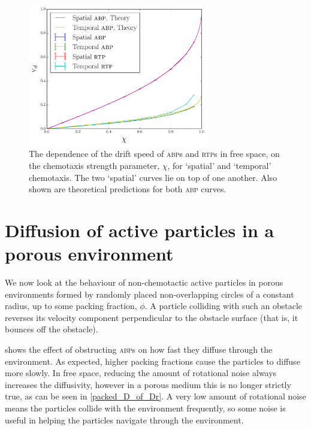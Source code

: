 \documentclass[a4wide,11pt]{article}
\begin{document}
\begin{figure}
    \centering
    \includegraphics[width=0.7\textwidth]{img/free_space_vd_of_chi.pdf}
    \caption{The dependence of the drift speed of \textsc{abp}s and \textsc{rtp}s in free space, on the chemotaxis strength parameter, $\chi$, for `spatial' and `temporal' chemotaxis. The two `spatial' curves lie on top of one another. Also shown are theoretical predictions for both \textsc{abp} curves.}
    \label{free_chi}
\end{figure}

\section{Diffusion of active particles in a porous environment}

We now look at the behaviour of non-chemotactic active particles in porous environments formed by randomly placed non-overlapping circles of a constant radius, up to some packing fraction, $\phi$. A particle colliding with such an obstacle reverses its velocity component perpendicular to the obstacle surface (that is, it bounces off the obstacle).

 shows the effect of obstructing \textsc{abp}s on how fast they diffuse through the environment. As expected, higher packing fractions cause the particles to diffuse more slowly. In free space, reducing the amount of rotational noise always increases the diffusivity, however in a porous medium this is no longer strictly true, as can be seen in \cref{packed_D_of_Dr}. A very low amount of rotational noise means the particles collide with the environment frequently, so some noise is useful in helping the particles navigate through the environment.
\end{document}
